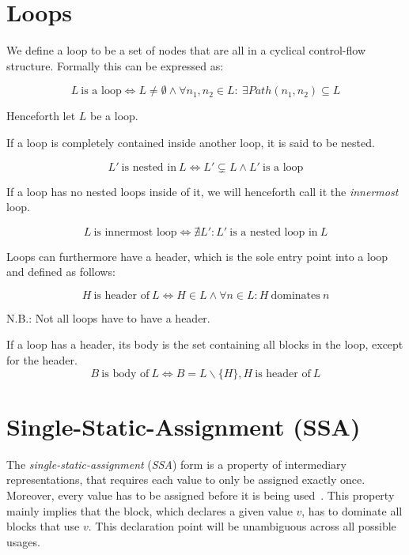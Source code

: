 
\section{Loops}\label{sec:basics:loops}

We define a loop to be a set of nodes that are all in a cyclical control-flow structure.
Formally this can be expressed as:

$$L~\text{is a loop} \Longleftrightarrow L \neq \emptyset \wedge \forall n_1, n_2 \in L:~\exists Path(n_1, n_2) \subseteq L$$

Henceforth let $L$ be a loop.

If a loop is completely contained inside another loop, it is said to be nested.

$$L'~\text{is nested in}~L \Longleftrightarrow L' \subsetneq L \wedge L'~\text{is a loop}$$

If a loop has no nested loops inside of it, we will henceforth call it the \textit{innermost} loop.

$$L~\text{is innermost loop} \Longleftrightarrow \nexists L': L'~\text{is a nested loop in}~L$$

Loops can furthermore have a header, which is the sole entry point into a loop~\cite{aebi18bachelorarbeit} and defined as follows:

$$H~\text{is header of}~L \Longleftrightarrow H \in L \wedge \forall n \in L: H~\text{dominates}~n$$

N.B.: Not all loops have to have a header.

If a loop has a header, its body is the set containing all blocks in the loop, except for the header.
$$B~\text{is body of}~L \Longleftrightarrow B = L \backslash \{H\}, H~\text{is header of}~L$$

\section{Single-Static-Assignment (SSA)}\label{sec:basics:ssa}

The \textit{single-static-assignment} (\textit{SSA}) form is a property of intermediary representations, that requires each value to only be assigned exactly once.
Moreover, every value has to be assigned before it is being used~\cite{cytron91}.
This property mainly implies that the block, which declares a given value $v$, has to dominate all blocks that use $v$.
This declaration point will be unambiguous across all possible usages.


